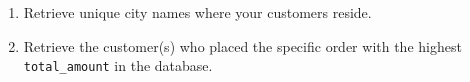 \documentclass[12pt,a4paper]{article}
\begin{document}
\begin{enumerate}


    \item Retrieve unique city names where your customers reside.







    \item Retrieve the customer(s) who placed the specific order with the highest \texttt{total\_amount} in the database.


\end{enumerate}
\end{document}
